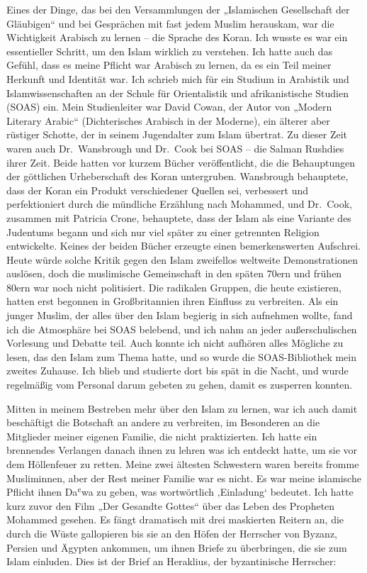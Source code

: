 \documentclass[12pt]{memoir}
\def\`{ʿ} %
\begin{document}
Eines der Dinge, das bei den Versammlungen
der „Islamischen Gesellschaft der Gläubigen“ und bei Gesprächen
mit fast jedem Muslim herauskam,
war die Wichtigkeit Arabisch zu lernen – die Sprache des Koran.
Ich wusste es war ein essentieller Schritt,
um den Islam wirklich zu verstehen.
Ich hatte auch das Gefühl, dass es meine Pflicht war Arabisch zu lernen,
da es ein Teil meiner Herkunft und Identität war.
Ich schrieb mich für ein Studium in Arabistik und Islamwissenschaften
an der Schule für Orientalistik und afrikanistische Studien (SOAS) ein.
Mein Studienleiter war David Cowan, der Autor von „Modern Literary Arabic“
(Dichterisches Arabisch in der Moderne), ein älterer aber rüstiger Schotte,
der in seinem Jugendalter zum Islam übertrat.
Zu dieser Zeit waren auch Dr.\ Wansbrough und Dr.\ Cook bei SOAS –
die Salman Rushdies ihrer Zeit.
Beide hatten vor kurzem Bücher veröffentlicht,
die die Behauptungen der göttlichen Urheberschaft des Koran untergruben.
Wansbrough behauptete, dass der Koran ein Produkt verschiedener Quellen sei,
verbessert und perfektioniert durch die mündliche Erzählung nach Mohammed,
und Dr.\ Cook, zusammen mit Patricia Crone, behauptete,
dass der Islam als eine Variante des Judentums begann
und sich nur viel später zu einer getrennten Religion entwickelte.
Keines der beiden Bücher erzeugte einen bemerkenswerten Aufschrei.
Heute würde solche Kritik gegen den Islam zweifellos
weltweite Demonstrationen auslösen,
doch die muslimische Gemeinschaft in den späten 70ern und frühen 80ern
war noch nicht politisiert.
Die radikalen Gruppen, die heute existieren,
hatten erst begonnen in Großbritannien ihren Einfluss zu verbreiten.
Als ein junger Muslim,
der alles über den Islam begierig in sich aufnehmen wollte,
fand ich die Atmosphäre bei SOAS belebend,
und ich nahm an jeder außerschulischen Vorlesung und Debatte teil.
Auch konnte ich nicht aufhören alles Mögliche zu lesen,
das den Islam zum Thema hatte,
und so wurde die SOAS-Bibliothek mein zweites Zuhause.
Ich blieb und studierte dort bis spät in die Nacht,
und wurde regelmäßig vom Personal darum gebeten zu gehen,
damit es zusperren konnten.

Mitten in meinem Bestreben mehr über den Islam zu lernen,
war ich auch damit beschäftigt die Botschaft an andere zu verbreiten,
im Besonderen an die Mitglieder meiner eigenen Familie,
die nicht praktizierten.
Ich hatte ein brennendes Verlangen danach ihnen zu lehren was ich
entdeckt hatte, um sie vor dem Höllenfeuer zu retten.
Meine zwei ältesten Schwestern waren bereits fromme Musliminnen,
aber der Rest meiner Familie war es nicht.
Es war meine islamische Pflicht ihnen Da\`wa zu geben,
was wortwörtlich ‚Einladung‘ bedeutet.
Ich hatte kurz zuvor den Film „Der Gesandte Gottes“
über das Leben des Propheten Mohammed gesehen.
Es fängt dramatisch mit drei maskierten Reitern an,
die durch die Wüste gallopieren bis sie an den Höfen der Herrscher
von Byzanz, Persien und Ägypten ankommen, um ihnen Briefe zu überbringen,
die sie zum Islam einluden.
Dies ist der Brief an Heraklius, der byzantinische Herrscher:
\end{document}
